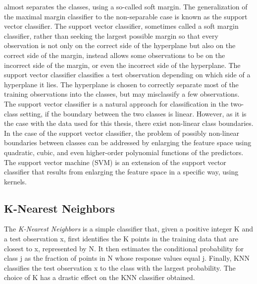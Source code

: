 almost separates the classes, using a so-called soft margin. The generalization of the maximal margin 
classifier to the non-separable case is known as the support vector classifier.
The support vector classifier, sometimes called a soft margin classifier, rather than seeking the largest 
possible margin so that every observation is not only on the correct side of the hyperplane but also 
on the correct side of the margin, instead allows some observations to be on the incorrect side of the 
margin, or even the incorrect side of the hyperplane.
The support vector classifier classifies a test observation depending on which side of a hyperplane it 
lies. The hyperplane is chosen to correctly separate most of the training observations into the 
classes, but may misclassify a few observations.
The support vector classifier is a natural approach for classification in the two-class setting, if the 
boundary between the two classes is linear. However, as it is the case with the data used for this thesis,
there exist non-linear class boundaries. 
In the case of the support vector classifier, the problem of possibly non-linear boundaries between classes can be 
addressed by enlarging the feature space using quadratic, cubic,  and even higher-order polynomial functions of the predictors.
The support vector machine (SVM) is an extension of the support vector classifier that results from 
enlarging the feature space in a specific way, using kernels.
\subsection{K-Nearest Neighbors}

The \textit{K-Nearest Neighbors} is a simple classifier that, given a positive integer K and a test observation x, 
first identifies the K points in the training data that are closest to x, represented by N. It then estimates the conditional 
probability for class j as the fraction of points in N whose response values equal j.
Finally, KNN classifies the test observation x to the class with the largest probability.
The choice of K has a drastic effect on the KNN classifier obtained.






